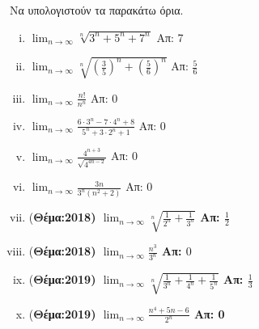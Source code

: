 \documentclass[a4paper,table]{report}
\begin{document}
Να υπολογιστούν τα παρακάτω όρια.

\begin{enumerate}[i)]
  \item $ \lim_{n \to \infty} \sqrt[n]{3^{n}+5^{n}+7^{n}}  $ \hfill Απ: 7 
  \item $ \lim_{n \to \infty} \sqrt[n]{\left(\frac{3}{5} \right)^{n} + 
    \left(\frac{5}{6} \right)^{n}} $ \hfill Απ: $ \frac{5}{6} $ 
  \item $ \lim_{n \to \infty} \frac{n!}{n^{n}} $ \hfill Απ: 0  
  \item $ \lim_{n \to \infty} \frac{6\cdot 3^{n}-7 \cdot 4^{n}+8}
    {5^{n}+3\cdot 2^{n}+1} $ \hfill Απ: 0  
  \item $ \lim_{n \to \infty} \frac{4^{n+3}}{\sqrt{4^{4n-2}}} $ \hfill Απ: 0  
  \item $ \lim_{n \to \infty} \frac{3n}{3^{n}(n^{2}+2)} $ \hfill Απ: 0  
  \item (\bfseries Θέμα:2018) $ \lim_{n \to \infty} \sqrt[n]{\frac{1}{2^{n}}+ 
    \frac{1}{3^{n}}} $ \hfill Απ: $ \frac{1}{2} $ 
  \item (\bfseries Θέμα:2018) $ \lim_{n \to \infty} \frac{n^{3}}{3^{n}} $ 
    \hfill Απ: $ 0 $
  \item (\bfseries Θέμα:2019) $ \lim_{n \to \infty} \sqrt[n]{\frac{1}{3^{n}} + 
    \frac{1}{4^{n}} + \frac{1}{5^{n}}} $ \hfill Απ: $ \frac{1}{3} $
  \item (\bfseries Θέμα:2019) $ \lim_{n \to \infty} \frac{n^{4}+5n-6}{2^{n}} $ 
    \hfill Απ: 0 
\end{enumerate}
\end{document}
